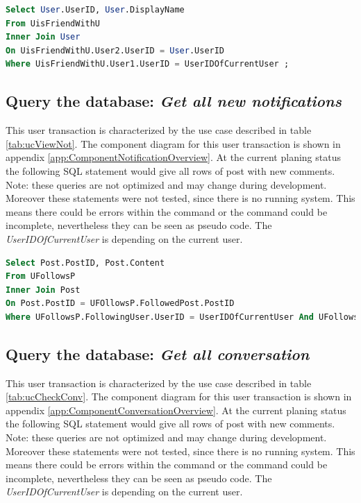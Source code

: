 \documentclass[11pt,a4paper]{report}
\begin{document}
\begin{lstlisting}[frame=single, language=SQL, caption=\emph{Get all friends} SQL statement, keepspaces=true, breaklines=true]
Select User.UserID, User.DisplayName
From UisFriendWithU
Inner Join User
On UisFriendWithU.User2.UserID = User.UserID
Where UisFriendWithU.User1.UserID = UserIDOfCurrentUser ;
\end{lstlisting}

\subsection{Query the database: \emph{Get all new notifications}}
This user transaction is characterized by the use case described in table \vref{tab:ucViewNot}. The component diagram for this user transaction is shown in appendix \vref{app:ComponentNotificationOverview}. At the current planing status the following SQL statement would give all rows of post with new comments. Note: these queries are not optimized and may change during development. Moreover these statements were not tested, since there is no running system. This means there could be errors within the command or the command could be incomplete, nevertheless they can be seen as pseudo code. The \emph{UserIDOfCurrentUser} is depending on the current user.

\begin{lstlisting}[frame=single, language=SQL, caption=\emph{Get all new notifications} SQL statement, keepspaces=true, breaklines=true]
Select Post.PostID, Post.Content
From UFollowsP
Inner Join Post
On Post.PostID = UFOllowsP.FollowedPost.PostID
Where UFollowsP.FollowingUser.UserID = UserIDOfCurrentUser And UFollowsP.Read = 0;
\end{lstlisting}

\subsection{Query the database: \emph{Get all conversation}}
This user transaction is characterized by the use case described in table \vref{tab:ucCheckConv}. The component diagram for this user transaction is shown in appendix \vref{app:ComponentConversationOverview}. At the current planing status the following SQL statement would give all rows of post with new comments. Note: these queries are not optimized and may change during development. Moreover these statements were not tested, since there is no running system. This means there could be errors within the command or the command could be incomplete, nevertheless they can be seen as pseudo code. The \emph{UserIDOfCurrentUser} is depending on the current user.
\end{document}
